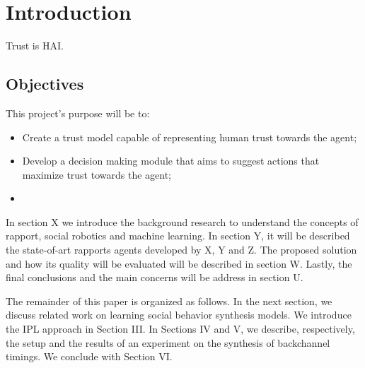\section{Introduction}
\label{sec:Introduction}
Trust is \ac{HAI}.





\subsection{Objectives}
\label{subsec:Objectives}
This project's purpose will be to:
\begin{itemize}
	\item Create a trust model capable of representing human trust towards the agent;
	\item Develop a decision making module that aims to suggest actions that maximize trust towards the agent;
	\item 
\end{itemize}





In section X we introduce the background research to understand the concepts of rapport, social robotics and machine learning. In section Y, it will be described the state-of-art rapports agents developed by X, Y and Z. The proposed solution and how its quality will be evaluated will be described in section W. Lastly, the final conclusions and the main concerns will be address in section U.

The remainder of this paper is organized as follows. In
the next section, we discuss related work on learning social behavior synthesis models. We introduce the IPL approach in Section III. In Sections IV and V, we describe, respectively, the setup and the results of an experiment on the synthesis of backchannel timings. We conclude with Section VI.
